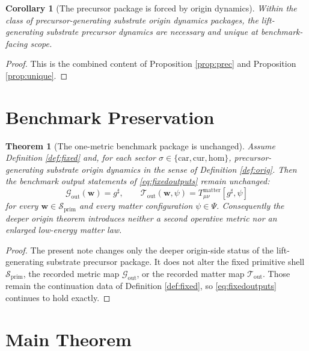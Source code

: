 \documentclass[11pt]{article}
\newcommand{\CompletedMetric}{g^{\sharp}}
\newcommand{\Car}{\mathrm{car}}
\newcommand{\Cur}{\mathrm{cur}}
\newcommand{\Hom}{\mathrm{hom}}
\newcommand{\PrimShell}{\mathcal S_{\mathrm{prim}}}
\newcommand{\MetricOut}{\mathscr G_{\mathrm{out}}}
\newcommand{\MatterOut}{\mathscr T_{\mathrm{out}}}
\newtheorem{corollary}{Corollary}
\newtheorem{theorem}{Theorem}
\begin{document}
\begin{corollary}[The precursor package is forced by origin dynamics]
\label{cor:forced}
Within the class of precursor-generating substrate origin dynamics packages, the lift-generating substrate precursor dynamics are necessary and unique at benchmark-facing scope.
\end{corollary}

\begin{proof}
This is the combined content of Proposition \ref{prop:prec} and Proposition \ref{prop:unique}.
\end{proof}

\section{Benchmark Preservation}

\begin{theorem}[The one-metric benchmark package is unchanged]
\label{thm:outputs}
Assume Definition \ref{def:fixed} and, for each sector \(\sigma\in\{\Car,\Cur,\Hom\}\), precursor-generating substrate origin dynamics in the sense of Definition \ref{def:orig}. Then the benchmark output statements of \eqref{eq:fixedoutputs} remain unchanged:
\[
\MetricOut(\mathbf w)=\CompletedMetric,
\qquad
\MatterOut(\mathbf w,\psi)
=
T_{\mu\nu}^{\mathrm{matter}}[\CompletedMetric,\psi]
\]
for every \(\mathbf w\in\PrimShell\) and every matter configuration \(\psi\in\Psi\). Consequently the deeper origin theorem introduces neither a second operative metric nor an enlarged low-energy matter law.
\end{theorem}

\begin{proof}
The present note changes only the deeper origin-side status of the lift-generating substrate precursor package. It does not alter the fixed primitive shell \(\PrimShell\), the recorded metric map \(\MetricOut\), or the recorded matter map \(\MatterOut\). Those remain the continuation data of Definition \ref{def:fixed}, so \eqref{eq:fixedoutputs} continues to hold exactly.
\end{proof}

\section{Main Theorem}
\end{document}
